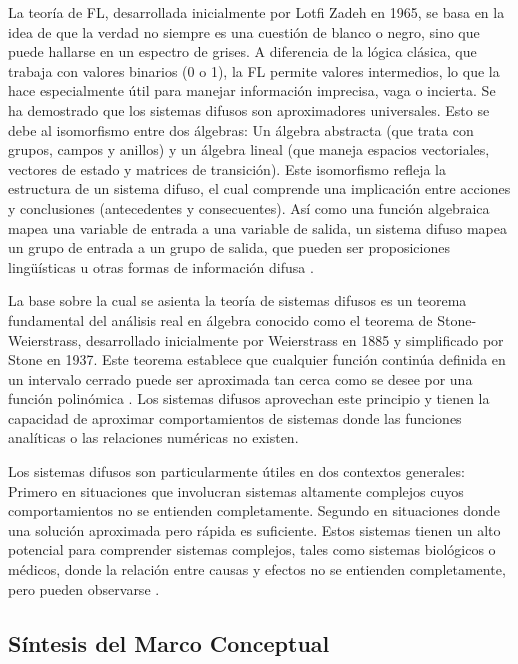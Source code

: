 La teoría de FL, desarrollada inicialmente por Lotfi Zadeh en 1965, se basa en la idea de que la verdad no siempre es una cuestión de blanco o negro, sino que puede hallarse en un espectro de grises. A diferencia de la lógica clásica, que trabaja con valores binarios (0 o 1), la FL permite valores intermedios, lo que la hace especialmente útil para manejar información imprecisa, vaga o incierta. Se ha demostrado que los sistemas difusos son aproximadores universales. Esto se debe al isomorfismo entre dos álgebras: Un álgebra abstracta (que trata con grupos, campos y anillos) y un álgebra lineal (que maneja espacios vectoriales, vectores de estado y matrices de transición). Este isomorfismo refleja la estructura de un sistema difuso, el cual comprende una implicación entre acciones y conclusiones (antecedentes y consecuentes). Así como una función algebraica mapea una variable de entrada a una variable de salida, un sistema difuso mapea un grupo de entrada a un grupo de salida, que pueden ser proposiciones lingüísticas u otras formas de información difusa \citep{Ross2010}.

La base sobre la cual se asienta la teoría de sistemas difusos es un teorema fundamental del análisis real en álgebra conocido como el teorema de Stone-Weierstrass, desarrollado inicialmente por Weierstrass en 1885 y simplificado por Stone en 1937. Este teorema establece que cualquier función continúa definida en un intervalo cerrado puede ser aproximada tan cerca como se desee por una función polinómica \citep{Ross2010,Gupta2011Tribute}. Los sistemas difusos aprovechan este principio y tienen la capacidad de aproximar comportamientos de sistemas donde las funciones analíticas o las relaciones numéricas no existen.

Los sistemas difusos son particularmente útiles en dos contextos generales: Primero en situaciones que involucran sistemas altamente complejos cuyos comportamientos no se entienden completamente. Segundo en situaciones donde una solución aproximada pero rápida es suficiente. Estos sistemas tienen un alto potencial para comprender sistemas complejos, tales como sistemas biológicos o médicos, donde la relación entre causas y efectos no se entienden completamente, pero pueden observarse \citep{Kaur2022}.

\subsection{Síntesis del Marco Conceptual}
\label{subsec:sintesis_marco_conceptual}

